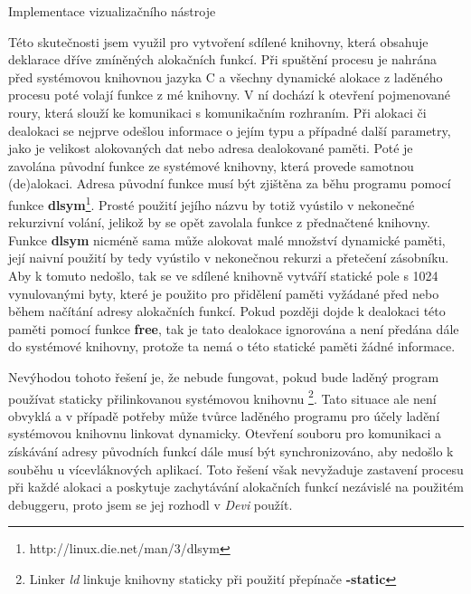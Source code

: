 \documentclass[bc,male,python,dept460]{diploma}						%
\newcommand{\parspace}[1][]{
	\ifthenelse{\isempty{#1}}{\vspace{5mm}}{\vspace{#1}}
	\par
}
\begin{document}
\begin{section}{Implementace vizualizačního nástroje}
\begin{description}
\begin{description}
				\parspace Této skutečnosti jsem využil pro vytvoření sdílené knihovny, která obsahuje deklarace dříve zmíněných alokačních funkcí.
				Při spuštění procesu je nahrána před systémovou knihovnou jazyka C a všechny dynamické alokace z laděného procesu poté volají funkce z mé knihovny.
				V ní dochází k otevření pojmenované roury, která slouží ke komunikaci s komunikačním rozhraním. %
				Při alokaci či dealokaci se nejprve odešlou informace o jejím typu a případné další parametry, jako je velikost alokovaných dat
				nebo adresa dealokované paměti. Poté je zavolána původní funkce ze systémové knihovny, která provede samotnou (de)alokaci.
				Adresa původní funkce musí být zjištěna za běhu programu pomocí
				funkce \textbf{dlsym}\footnote{http://linux.die.net/man/3/dlsym}. Prosté použití jejího názvu by totiž vyústilo v nekonečné rekurzivní volání, jelikož
				by se opět zavolala funkce z přednačtené knihovny. Funkce \textbf{dlsym} nicméně sama může alokovat malé množství dynamické paměti,
				její naivní použití by tedy vyústilo v nekonečnou rekurzi a přetečení zásobníku.
				Aby k tomuto nedošlo, tak se ve sdílené knihovně vytváří statické pole s 1024 vynulovanými
				byty, které je použito pro přidělení paměti vyžádané před nebo během načítání adresy alokačních funkcí. Pokud později dojde k dealokaci této
				paměti pomocí funkce \textbf{free}, tak je tato dealokace ignorována a není předána dále do systémové knihovny, protože ta nemá o této statické paměti
				žádné informace.
				
				\parspace Nevýhodou tohoto řešení je, že nebude fungovat, pokud bude laděný program používat staticky přilinkovanou systémovou knihovnu
				\footnote{Linker \textit{ld} linkuje knihovny staticky při použití přepínače \textbf{-static}}.
				Tato situace ale není obvyklá a v případě potřeby může tvůrce laděného programu pro účely ladění systémovou knihovnu linkovat dynamicky.
				Otevření souboru pro komunikaci a získávání adresy původních funkcí dále musí být synchronizováno, aby nedošlo k souběhu u vícevláknových aplikací.
				Toto řešení však nevyžaduje zastavení procesu při každé alokaci a poskytuje zachytávání alokačních funkcí nezávislé na použitém debuggeru, proto
				jsem se jej rozhodl v \textit{Devi} použít.
				
			\end{description}
			

\end{description}
\end{section}
\end{document}
